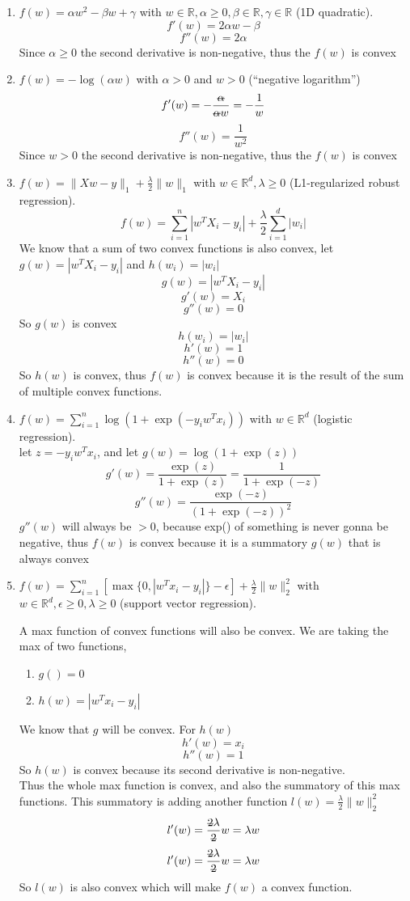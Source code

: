 \documentclass{article}
\def\norm#1{\|#1\|}
\def\ans#1{{\color{ans}#1}}
\def\R{\mathbb{R}}
\def\enum#1{\begin{enumerate}#1\end{enumerate}}
\begin{document}
\enum{
\item $f(w) = \alpha w^2 - \beta w + \gamma$ with $w \in \R, \alpha \geq 0, \beta \in \R, \gamma \in \R$ (1D quadratic). \\
\ans{
    \[ f'(w) = 2\alpha w - \beta \]
    \[ f''(w) = 2\alpha \]
    Since $\alpha \geq 0$ the second derivative is non-negative, thus the $f(w)$ is convex
}
\item $f(w) = -\log(\alpha w) $ with $\alpha > 0$ and $w > 0$ (``negative logarithm'') \\
\ans{
    \[ f'(w) = -\frac{\text{\st{$\alpha$}}}{\text{\st{$\alpha$}} w } = - \frac{1}{w} \]
    \[ f''(w) = \frac{1}{w^2} \] 
    Since $w > 0$ the second derivative is non-negative, thus the $f(w)$ is convex
}
\item $f(w) = \norm{Xw-y}_1 + \frac{\lambda}{2}\norm{w}_1$ with $w \in \R^d, \lambda \geq 0$ (L1-regularized robust regression). \\
\ans{
    \[ f(w) = \sum_{i=1}^n |w^TX_i - y_i| + \frac{\lambda}{2} \sum_{i=1}^d |w_i| \]
    We know that a sum of two convex functions is also convex, let $g(w) = |w^TX_i - y_i|$ and 
    $h(w_i) = |w_i|$
    \[g(w) = |w^TX_i - y_i|\]
    \[g'(w) = X_i\]
    \[g''(w) = 0\]
    So $g(w)$ is convex
    \[h(w_i) = |w_i|\]
    \[h'(w) = 1\]
    \[h''(w) = 0\]
    So $h(w)$ is convex, thus $f(w)$ is convex because it is the result of the sum of multiple 
    convex functions.
}
\item $f(w) = \sum_{i=1}^n \log(1+\exp(-y_iw^Tx_i)) $ with $w \in \R^d$ (logistic regression). \\
\ans{
    let $z = -y_iw^Tx_i$, and let $g(w) = \log(1+\exp(z))$ 
    \[ g'(w) = \frac{\exp(z)}{1+\exp(z)} = \frac{1}{1+\exp(-z)} \]
    \[ g''(w) = \frac{\exp(-z)}{(1+\exp(-z))^2} \]
    $g''(w)$ will always be $> 0$, because exp() of something is never gonna be negative, thus 
    $f(w)$ is convex because it is a summatory $g(w)$ that is always convex
}
\item $f(w) = \sum_{i=1}^n[\max\{0,|w^Tx_i - y_i|\} - \epsilon] + \frac{\lambda}{2}\norm{w}_2^2$  with $w \in \R^d, \epsilon \geq 0, \lambda \geq 0$ (support vector regression). \\
\ans{
    A max function of convex functions will also be convex. We are taking the max of two functions, 
    \begin{enumerate}
        \item $g() = 0$
        \item $h(w) = |w^Tx_i - y_i|$
    \end{enumerate}
    We know that $g$ will be convex. For $h(w)$
    \[ h'(w) = x_i\]
    \[ h''(w) = 1\] So $h(w)$ is convex because its second derivative is non-negative.\\
    Thus the whole max function is convex, and also the summatory of this max functions. This summatory 
    is adding another function $l(w) = \frac{\lambda}{2}\norm{w}_2^2$
    \[ l'(w) = \frac{\text{\st{2}}\lambda}{\text{\st{2}}}w = \lambda w\]
    \[ l'(w) = \frac{\text{\st{2}}\lambda}{\text{\st{2}}}w = \lambda w\]
    So $l(w)$ is also convex which will make $f(w)$ a convex function.
}
}
\end{document}
